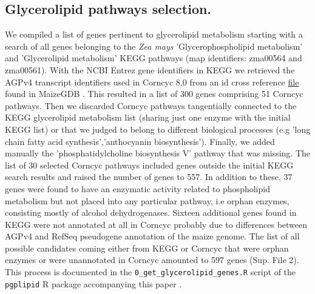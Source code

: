 \documentclass[9pt,twocolumn,twoside,lineno]{biorxiv}
\begin{document}
\subsection{Glycerolipid pathways selection.}
We compiled a list of genes pertinent to glycerolipid metabolism starting with a search of all genes belonging to the \textit{Zea mays} 'Glycerophospholipid metabolism' and 'Glycerolipid metabolism' KEGG pathways \cite{kanehisa2019} (map identifiers: zma00564 and zma00561). 
With the NCBI Entrez gene identifiers in KEGG we retrieved the AGPv4 transcript identifiers used in Corncyc 8.0 \cite{portwood2019, walsh2016} from an id cross reference \href{https://www.maizegdb.org/search/gene/download_gene_xrefs.php?relative=v4}{file} found in MaizeGDB   \cite{portwood2019}.
This resulted in a list of 300 genes comprising 51 Corncyc pathways. 
Then we discarded Corncyc pathways  tangentially connected to the KEGG glycerolipid metabolism list (sharing just one enzyme with the initial KEGG list) or that we judged to belong to different biological processes (e.g 'long chain fatty acid synthesis','anthocyanin biosynthesis'). 
Finally, we added manually the 'phosphatidylcholine biosynthesis V' pathway that was missing. 
The list of 30 selected Corncyc pathways included genes outside the initial KEGG search results and raised the number of genes to 557. 
In addition to these, 37 genes were found to have an enzymatic activity related to phospholipid metabolism but not placed into any particular pathway, i.e orphan enzymes, consisting mostly of alcohol dehydrogenases. 
Sixteen additional genes found in KEGG were not annotated at all in Corncyc probably due to differences between AGPv4 and RefSeq pseudogene annotation of the maize genome. 
The list of all possible candidates coming either from KEGG or Corncyc that were orphan enzymes or were unannotated in Corncyc amounted to 597 genes (Sup. File 2). 
This process is documented in the \verb|0_get_glycerolipid_genes.R| script of the \verb|pgplipid| R package accompanying this paper \cite{fausto_rodriguez_zapata_2020_4323410}.
\end{document}
